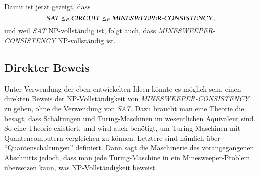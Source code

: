 Damit ist jetzt gezeigt, dass
\[
\text{\textsl{SAT}}\le_P
\text{\textsl{CIRCUIT}}\le_P\text{\textsl{MINESWEEPER-CONSISTENCY}},
\]
und weil \textsl{SAT} NP-vollständig ist, folgt auch, dass 
\textsl{MINESWEEPER-CONSISTENCY} NP-vollständig ist.

\subsection{Direkter Beweis}
Unter Verwendung der eben entwickelten Ideen könnte es möglich sein,
einen direkten Beweis der NP-Vollständigkeit von
\textsl{MINESWEEPER-CONSISTENCY} zu geben, ohne die Verwendung
von \textsl{SAT}.
Dazu braucht man eine Theorie die besagt, dass
Schaltungen und Turing-Maschinen im wesentlichen Äquivalent sind.
So eine Theorie existiert, und wird auch benötigt, um Turing-Maschinen
mit Quantencomputern vergleichen zu können.
Letztere sind nämlich
über ``Quantenschaltungen'' definiert.
Dann sagt die Maschinerie des
vorangegangenen Abschnitts jedoch, dass man jede Turing-Maschine in
ein Minesweeper-Problem übersetzen kann, was NP-Vollständigkeit
beweist.
